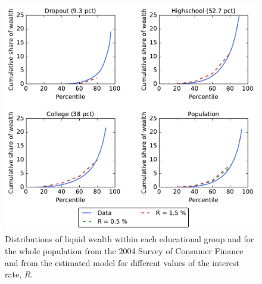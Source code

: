 \documentclass[../HAFiscal]{subfiles}
\begin{document}
\begin{figure}[th]
	\begin{center}
		\includegraphics[width=.9\textwidth]{../Figures/LorenzPoints_robustness_R.pdf}
		\caption{Distributions of liquid wealth within each educational group and for the whole population from the 2004 Survey of Consumer Finance and from the estimated model for different values of the interest rate, $R$.}
		\label{fig:LorenzPts_robustness_R}
	\end{center}
\end{figure}
\end{document}
